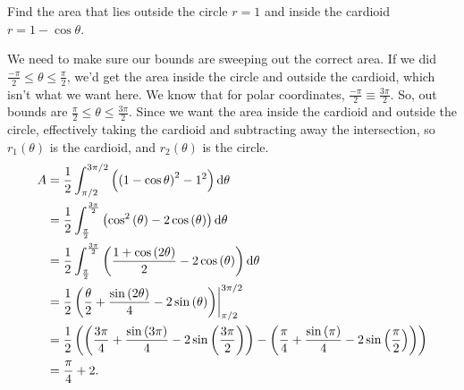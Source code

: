 \begin{example}
	Find the area that lies outside the circle $r=1$ and inside the cardioid $r=1-\cos{\theta}$.
\end{example}
\begin{answer}
	We need to make sure our bounds are sweeping out the correct area.
	If we did $\frac{-\pi}{2} \leq \theta \leq \frac{\pi}{2}$, we'd get the area inside the circle and outside the cardioid, which isn't what we want here.
	We know that for polar coordinates, $\frac{-\pi}{2} \equiv \frac{3\pi}{2}$.
	So, out bounds are $\frac{\pi}{2} \leq \theta \leq \frac{3\pi}{2}$.
	Since we want the area inside the cardioid and outside the circle, effectively taking the cardioid and subtracting away the intersection, so $r_1(\theta)$ is the cardioid, and $r_2(\theta)$ is the circle.
	\begin{align*}
		A &= \frac{1}{2}\int_{\pi/2}^{3\pi/2}{\left(\left(1-\cos{\theta}\right)^2-1^2\right)\mathrm{d} \theta} \\
		&= \frac{1}{2}\int_{\frac{\pi}{2}}^{\frac{3\pi}{2}}\left(\cos^{2}\left(\theta\right)-2\cos\left(\theta\right)\right)\mathrm{d} \theta \\
		&= \frac{1}{2}\int_{\frac{\pi}{2}}^{\frac{3\pi}{2}}\left(\frac{1+\cos\left(2\theta\right)}{2}-2\cos\left(\theta\right)\right)\mathrm{d} \theta \\
		&= \frac{1}{2}\left(\frac{\theta}{2}+\frac{\sin\left(2\theta\right)}{4}-2\sin\left(\theta\right)\right)\biggr\rvert_{\pi/2}^{3\pi/2} \\
		&= \frac{1}{2}\left(\left(\frac{3\pi}{4}+\frac{\sin\left(3\pi\right)}{4}-2\sin\left(\frac{3\pi}{2}\right)\right)-\left(\frac{\pi}{4}+\frac{\sin\left(\pi\right)}{4}-2\sin\left(\frac{\pi}{2}\right)\right)\right) \\
		&= \frac{\pi}{4}+2.
	\end{align*}
\end{answer}

